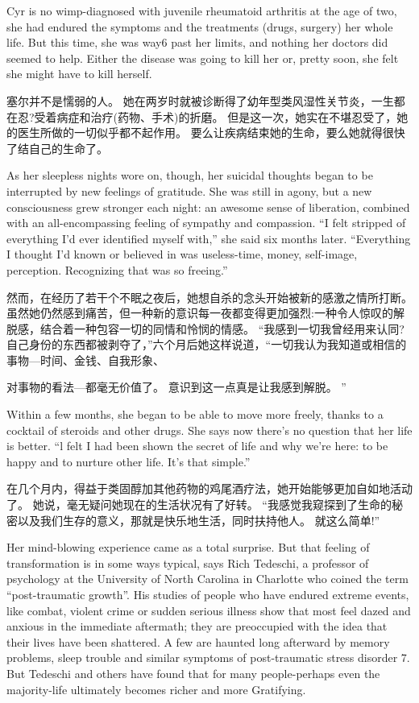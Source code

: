 \documentclass[cs4size, a4paper, 12pt]{article}
\newcounter{numpar}
\newcommand*{\newpar}{\numpar{}}
\begin{document}
	\newpar Cyr is no wimp-diagnosed with juvenile rheumatoid arthritis at the age of two, she had endured the symptoms and the treatments (drugs, surgery) her whole life. But this time, she was way6 past her limits, and nothing her doctors did seemed to help. Either the disease was going to kill her or, pretty soon, she felt she might have to kill herself.
	
	塞尔并不是懦弱的人。 她在两岁时就被诊断得了幼年型类风湿性关节炎，一生都在忍?受着病症和治疗(药物、手术)的折磨。 但是这一次，她实在不堪忍受了，她的医生所做的一切似乎都不起作用。 要么让疾病结束她的生命，要么她就得很快了结自己的生命了。 
	
	\newpar As her sleepless nights wore on, though, her suicidal thoughts began to be interrupted by new feelings of gratitude. She was still in agony, but a new consciousness grew stronger each night: an awesome sense of liberation, combined with an all-encompassing feeling of sympathy and compassion. ``I felt stripped of everything I'd ever identified myself with,'' she said six months later. ``Everything I thought I'd known or believed in was useless-time, money, self-image, perception. Recognizing that was so freeing.''
	
	然而，在经历了若干个不眠之夜后，她想自杀的念头开始被新的感激之情所打断。 虽然她仍然感到痛苦，但一种新的意识每一夜都变得更加强烈:一种令人惊叹的解脱感，结合着一种包容一切的同情和怜悯的情感。 ``我感到一切我曾经用来认同?自己身份的东西都被剥夺了，''六个月后她这样说道，``一切我认为我知道或相信的事物—时间、金钱、自我形象、
	
	对事物的看法—都毫无价值了。 意识到这一点真是让我感到解脱。 ''
	
	\newpar Within a few months, she began to be able to move more freely, thanks to a cocktail of steroids and other drugs. She says now there's no question that her life is better. ``l felt I had been shown the secret of life and why we're here: to be happy and to nurture other life. It's that simple.''
	
	在几个月内，得益于类固醇加其他药物的鸡尾酒疗法，她开始能够更加自如地活动了。 她说，毫无疑问她现在的生活状况有了好转。 ``我感觉我窥探到了生命的秘密以及我们生存的意义，那就是快乐地生活，同时扶持他人。 就这么简单!''
	
	\newpar Her mind-blowing experience came as a total surprise. But that feeling of transformation is in some ways typical, says Rich Tedeschi, a professor of psychology at the University of North Carolina in Charlotte who coined the term ``post-traumatic growth''. His studies of people who have endured extreme events, like combat, violent crime or sudden serious illness show that most feel dazed and anxious in the immediate aftermath; they are preoccupied with the idea that their lives have been shattered. A few are haunted long afterward by memory problems, sleep trouble and similar symptoms of post-traumatic stress disorder 7. But Tedeschi and others have found that for many people-perhaps even the majority-life ultimately becomes richer and more Gratifying.
	
\end{document}
